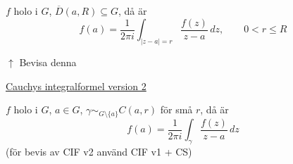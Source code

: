 \begin{theorem}
$f$ holo i $G$, $\overline{D}(a, R) \subseteq G$, då är
\[ f(a) = \frac{1}{2\pi i}\int_{|z - a| = r} \frac{f(z)}{z - a}\,dz, \qquad 0 < r \le R \]
\end{theorem}
\textcolor{magenta!80!black}{$\uparrow$ Bevisa denna}

\begin{note}
\underline{Cauchys integralformel version 2}

$f$ holo i $G$, $a \in G$, $\gamma \sim_{G \setminus \{a\}} C(a, r)$ för små $r$, då är
\[ f(a) = \frac{1}{2\pi i}\int_\gamma \frac{f(z)}{z - a}\,dz \]
(för bevis av CIF v2 använd CIF v1 + CS)
\end{note}
